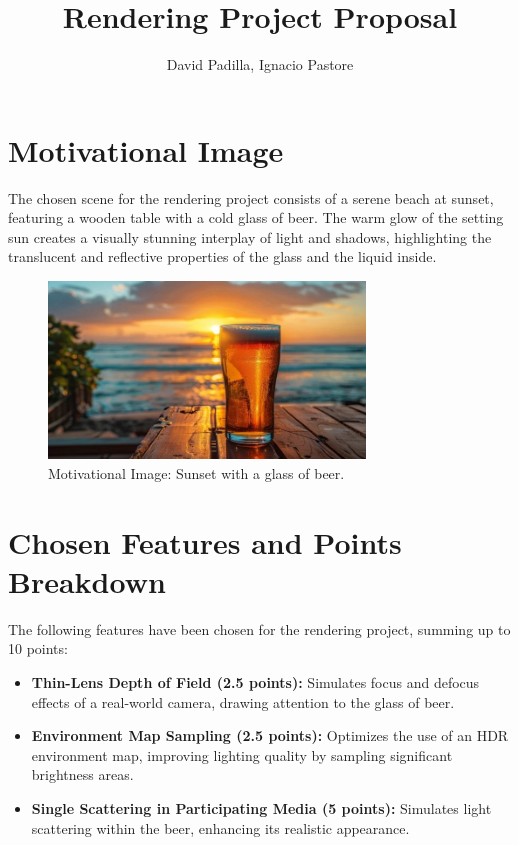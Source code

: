 \documentclass[a4paper,11pt]{article}
\title{\vspace{-2em}Rendering Project Proposal}
\author{David Padilla, Ignacio Pastore}
\date{}
\begin{document}
\maketitle

\section*{Motivational Image}
The chosen scene for the rendering project consists of a serene beach at sunset, featuring a wooden table with a cold glass of beer. The warm glow of the setting sun creates a visually stunning interplay of light and shadows, highlighting the translucent and reflective properties of the glass and the liquid inside.

\begin{figure}[H]
    \centering
    \includegraphics[width=0.75\textwidth]{sunset-beer-relaxation-stockcake.jpg} %
    \caption{Motivational Image: Sunset with a glass of beer.}
\end{figure}

\section*{Chosen Features and Points Breakdown}
The following features have been chosen for the rendering project, summing up to 10 points:
\begin{itemize}
    \item \textbf{Thin-Lens Depth of Field (2.5 points):} Simulates focus and defocus effects of a real-world camera, drawing attention to the glass of beer.
    \item \textbf{Environment Map Sampling (2.5 points):} Optimizes the use of an HDR environment map, improving lighting quality by sampling significant brightness areas.
    \item \textbf{Single Scattering in Participating Media (5 points):} Simulates light scattering within the beer, enhancing its realistic appearance.
\end{itemize}
\end{document}
